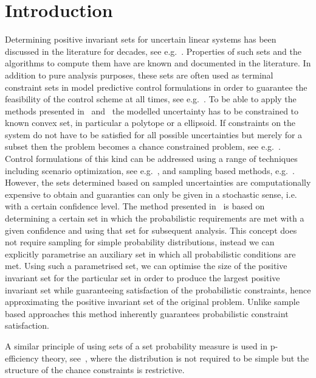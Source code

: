 \documentclass{ifacconf}
\begin{document}
\section{Introduction}
%
%
Determining positive invariant sets for uncertain linear systems has been discussed in the literature for decades, see e.g.~\cite{Kolmanovsky:1995,Kolmanovsky:1998,blanchini:2007}.
%
Properties of such sets and the algorithms to compute them have are known and documented in the literature.
%
In addition to pure analysis purposes, these sets are often used as terminal constraint sets in model predictive control formulations in order to guarantee the feasibility of the control scheme at all times, see e.g.~\cite{Mayne2014}.
%
To be able to apply the methods presented in~\cite{Kolmanovsky:1998} and~\cite{blanchini:2007} the modelled uncertainty has to be constrained to known convex set, in particular a polytope or a ellipsoid.
%
If constraints on the system do not have to be satisfied for all possible uncertainties but merely for a subset then the problem becomes a chance constrained problem, see e.g.~\cite{Kall2010}.
%
Control formulations of this kind can be addressed using a range of techniques including scenario optimization, see e.g.~\cite{Calafiore2010}, and sampling based methods, e.g.~\cite{Margellos2014,Zhang2015}.
%
However, the sets determined based on sampled uncertainties are computationally expensive to obtain and guaranties can only be given in a stochastic sense, i.e. with a certain confidence level.
%
The method presented in~\cite{Zhang2015} is based on determining a certain set in which the probabilistic requirements are met with a given confidence and using that set for subsequent analysis.
%
This concept does not require sampling for simple probability distributions, instead we can explicitly parametrise an auxiliary set in which all probabilistic conditions are met.
%
Using such a parametrised set, we can optimise the size of the positive invariant set for the particular set in order to produce the largest positive invariant set while guaranteeing satisfaction of the probabilistic constraints, hence approximating the positive invariant set of the original problem.
%
Unlike sample based approaches this method inherently guarantees probabilistic constraint satisfaction.

A similar principle of using sets of a set probability measure is used in p-efficiency theory, see~\cite{Dentcheva2009}, where the distribution is not required to be simple but the structure of the chance constraints is restrictive.
\end{document}
